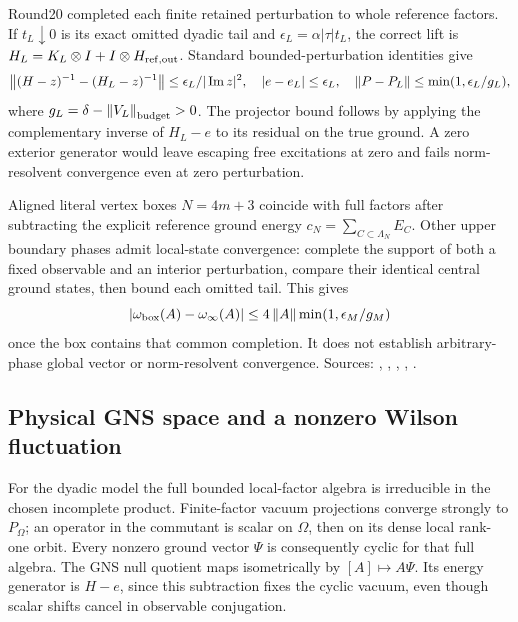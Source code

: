 Round20 completed each finite retained perturbation to whole reference
factors. If \(t_L\downarrow0\) is its exact omitted dyadic tail and
\(\epsilon_L=\alpha|\tau|t_L\), the correct lift is
\(H_L=K_L\otimes I+I\otimes H_{{\rm ref,out}}\).
Standard bounded-perturbation identities \cite{teschl2014methods} give
\[
 \left\lVert (H-z)^{-1}-(H_L-z)^{-1}\right\rVert
 \le\epsilon_L/|\operatorname{Im}z|^2,\quad
 |e-e_L|\le\epsilon_L,\quad
 \left\lVert P-P_L\right\rVert\le\min(1,\epsilon_L/g_L),
\]
where \(g_L=\delta-\left\lVert V_L\right\rVert_{\rm budget}>0\).
The projector bound follows by applying the complementary inverse of
\(H_L-e\) to its residual on the true ground. A zero exterior generator
would leave escaping free excitations at zero and fails norm-resolvent
convergence even at zero perturbation.

Aligned literal vertex boxes \(N=4m+3\) coincide with full factors after
subtracting the explicit reference ground energy
\(c_N=\sum_{C\subset\Lambda_N}E_C\). Other upper boundary phases admit
local-state convergence: complete the support of both a fixed observable
and an interior perturbation, compare their identical central ground
states, then bound each omitted tail. This gives
\[
 |\omega_{\rm box}(A)-\omega_\infty(A)|
 \le4\left\lVert A\right\rVert\min(1,\epsilon_M/g_M)
\]
once the box contains that common completion. It does not establish
arbitrary-phase global vector or norm-resolvent convergence.
Sources: ,
,
,
,
.

\subsection{Physical GNS space and a nonzero Wilson fluctuation \workstar}
\label{sec:middle-gns}

For the dyadic model the full bounded local-factor algebra is irreducible
in the chosen incomplete product. Finite-factor vacuum projections
converge strongly to \(P_\Omega\); an operator in the commutant is scalar
on \(\Omega\), then on its dense local rank-one orbit. Every nonzero
ground vector \(\Psi\) is consequently cyclic for that full algebra.
The GNS null quotient maps isometrically by \([A]\mapsto A\Psi\).
Its energy generator is \(H-e\), since this subtraction fixes the cyclic
vacuum, even though scalar shifts cancel in observable conjugation.

